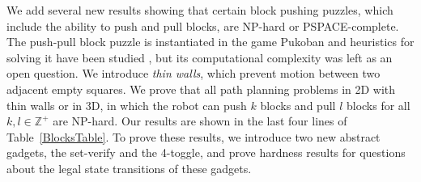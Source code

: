 

We add several new results showing that certain block pushing puzzles, which include the ability to push and pull blocks, are NP-hard or PSPACE-complete. The push-pull block puzzle is instantiated in the game Pukoban and heuristics for solving it have been studied \cite{zubaranagent}, but its computational complexity was left as an open question.
We introduce \emph{thin walls}, which prevent motion between two adjacent empty squares. We prove that all path planning problems in 2D with thin walls or in 3D, in which the robot can push $k$ blocks and pull $l$ blocks for all $k,l \in \mathbb{Z}^+$ are NP-hard. Our results are shown in the last four lines of Table~\ref{BlocksTable}. To prove these results, we introduce two new abstract gadgets, the set-verify and the 4-toggle, and prove hardness results for questions about the legal state transitions of these gadgets. %


